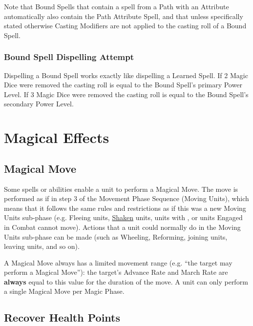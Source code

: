 Note that Bound Spells that contain a spell from a Path with an Attribute automatically also contain the Path Attribute Spell, and that unless specifically stated otherwise Casting Modifiers are not applied to the casting roll of a Bound Spell.

\subsubsection{Bound Spell Dispelling Attempt}

Dispelling a Bound Spell works exactly like dispelling a Learned Spell. If 2 Magic Dice were removed the casting roll is equal to the Bound Spell's primary Power Level. If 3 Magic Dice were removed the casting roll is equal to the Bound Spell's secondary Power Level.

\section{Magical Effects}

\subsection{Magical Move}
\label{magical_move}

Some spells or abilities enable a unit to perform a Magical Move. The move is performed as if in step 3 of the Movement Phase Sequence (Moving Units), which means that it follows the same rules and restrictions as if this was a new Moving Units sub-phase (e.g. Fleeing units, \hyperref[shaken]{Shaken} units, units with \hyperref[random_movement]{\randommovement{}}, or units Engaged in Combat cannot move). Actions that a unit could normally do in the Moving Units sub-phase can be made (such as Wheeling, Reforming, joining units, leaving units, and so on).

A Magical Move always has a limited movement range (e.g. \enquote{the target may perform a  Magical Move}): the target's Advance Rate and March Rate are \textbf{always} equal to this value for the duration of the move. A unit can only perform a single Magical Move per Magic Phase.

\newpage
\subsection{Recover Health Points}
\label{recover_health_points}

